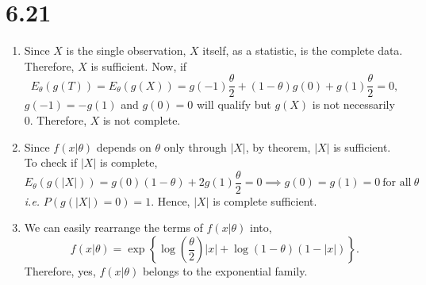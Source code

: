 \documentclass[letterpaper]{article}
\begin{document}
    \section*{6.21}
    \begin{enumerate}
    \item Since $X$ is the single observation, $X$ itself, as a statistic, is the complete data. Therefore, $X$ is sufficient.
    Now, if
    \[
    E_\theta(g(T)) = E_\theta(g(X)) = g(-1) \frac{\theta}{2} + (1-\theta) g(0) + g(1) \frac{\theta}{2} = 0,
    \]
    $g(-1) = -g(1)$ and $g(0) = 0$ will qualify but $g(X)$ is not necessarily 0. Therefore, $X$ is not complete.

    \item Since $f(x|\theta)$ depends on $\theta$ only through $|X|$, by theorem, $|X|$ is sufficient.
    To check if $|X|$ is complete, 
    \[
    E_\theta(g(|X|)) = g(0) (1-\theta) + 2 g(1) \frac{\theta}{2} = 0 \implies g(0) = g(1) = 0 ~\text{for all}~ \theta
    \]
    \emph{i.e.} $P(g(|X|) = 0) = 1$. Hence, $|X|$ is complete sufficient.

    \item We can easily rearrange the terms of $f(x|\theta)$ into,
    \[
    f(x|\theta) = \exp\left\{\log\left(\frac{\theta}{2}\right) |x| + \log(1-\theta) (1-|x|)\right\}.
    \]
    Therefore, yes, $f(x|\theta)$ belongs to the exponential family.
    \end{enumerate}
\end{document}

